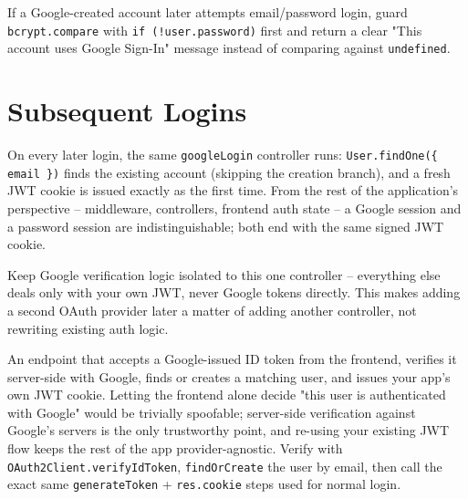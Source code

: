 \begin{notebox}[NOTE]
If a Google-created account later attempts email/password login, guard \texttt{bcrypt.compare} with \texttt{if (!user.password)} first and return a clear "This account uses Google Sign-In" message instead of comparing against \texttt{undefined}.
\end{notebox}

\section{Subsequent Logins}

On every later login, the same \texttt{googleLogin} controller runs: \texttt{User.findOne(\{ email \})} finds the existing account (skipping the creation branch), and a fresh JWT cookie is issued exactly as the first time. From the rest of the application's perspective -- middleware, controllers, frontend auth state -- a Google session and a password session are indistinguishable; both end with the same signed JWT cookie.

\begin{tipbox}[TIP]
Keep Google verification logic isolated to this one controller -- everything else deals only with your own JWT, never Google tokens directly. This makes adding a second OAuth provider later a matter of adding another controller, not rewriting existing auth logic.
\end{tipbox}

\whatwhyhow
{An endpoint that accepts a Google-issued ID token from the frontend, verifies it server-side with Google, finds or creates a matching user, and issues your app's own JWT cookie.}
{Letting the frontend alone decide "this user is authenticated with Google" would be trivially spoofable; server-side verification against Google's servers is the only trustworthy point, and re-using your existing JWT flow keeps the rest of the app provider-agnostic.}
{Verify with \texttt{OAuth2Client.verifyIdToken}, \texttt{findOrCreate} the user by email, then call the exact same \texttt{generateToken} + \texttt{res.cookie} steps used for normal login.}
